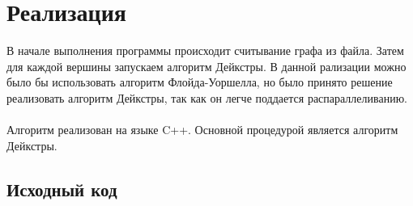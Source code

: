 \documentclass[12pt]{article}
\begin{document}
\section{Реализация} 
В начале выполнения программы происходит считывание графа из файла. 
Затем для каждой вершины запускаем алгоритм Дейкстры. В данной рализации можно было бы использовать 
алгоритм Флойда-Уоршелла, но было принято решение реализовать алгоритм Дейкстры, так как он легче поддается распараллеливанию.

\paragraph{}
Алгоритм реализован на языке C++. Основной процедурой является
алгоритм Дейкстры\cite{dijkstra}.


\subsection{Исходный код}
\end{document}
